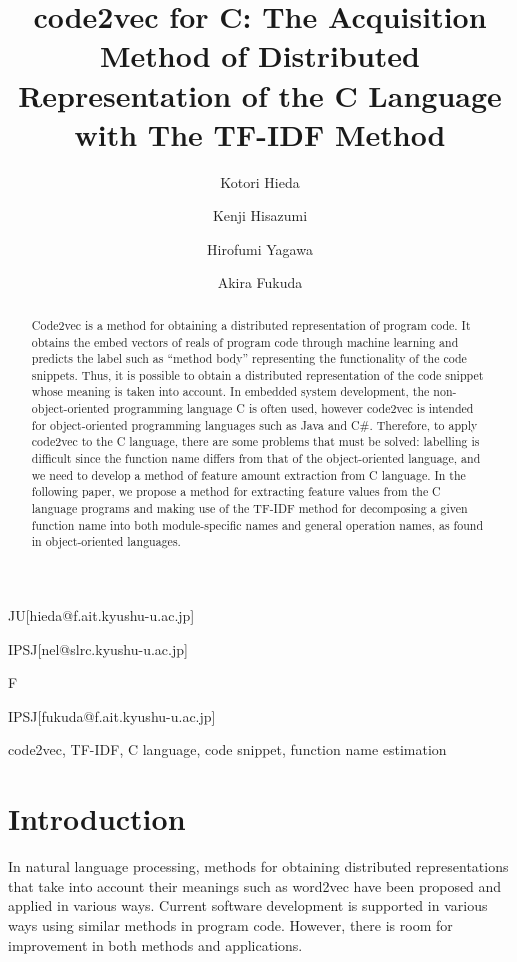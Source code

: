 \documentclass[JIP]{apris}
\begin{document}
\title{code2vec for C: The Acquisition Method of Distributed Representation of the C Language with The TF-IDF Method}


\author{Kotori Hieda}{JU}[hieda@f.ait.kyushu-u.ac.jp]
\author{Kenji Hisazumi}{IPSJ}[nel@slrc.kyushu-u.ac.jp]
\author{Hirofumi Yagawa}{F}
\author{Akira Fukuda}{IPSJ}[fukuda@f.ait.kyushu-u.ac.jp]


\begin{abstract}
Code2vec is a method for obtaining a distributed representation of program code. It obtains the embed vectors of reals of program code through machine learning and predicts the label such as ``method body'' representing the functionality of the code snippets. Thus, it is possible to obtain a distributed representation of the code snippet whose meaning is taken into account. In embedded system development, the non-object-oriented programming language C is often used, however code2vec is intended for object-oriented programming languages such as Java and C\#. Therefore, to apply code2vec to the C language, there are some problems that must be solved: labelling is difficult since the function name differs from that of the object-oriented language, and we need to develop a method of feature amount extraction from C language. In the following paper, we propose a method for extracting feature values from the C language programs and making use of the TF-IDF method for decomposing a given function name into both module-specific names and general operation names, as found in object-oriented languages.
\end{abstract}

\begin{keyword}
code2vec, TF-IDF, C language, code snippet, function name estimation
\end{keyword}

\maketitle

\section{Introduction}
In natural language processing, methods for obtaining distributed representations that take into account their meanings such as word2vec\cite{rong2014word2vec} have been proposed and applied in various ways. Current software development is supported in various ways using similar methods in program code. However, there is room for improvement in both methods and applications. 
\end{document}
